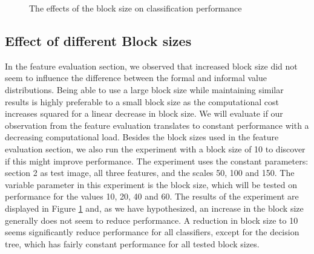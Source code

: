 \datatwo

\begin{figure}[]
	\caption{The effects of the block size on classification performance}
	\label{fig:res_bar_2}
\end{figure}

\subsection{Effect of different Block sizes}
In the feature evaluation section, we observed that increased block size did not seem to influence the difference between the formal and informal value distributions. Being able to use a large block size while maintaining similar results is highly preferable to a small block size as the computational cost increases squared for a linear decrease in block size. We will evaluate if our observation from the feature evaluation translates to constant performance with a decreasing computational load. Besides the block sizes used in the feature evaluation section, we also run the experiment with a block size of 10 to discover if this might improve performance. The experiment uses the constant parameters: section 2 as test image, all three features, and the scales 50, 100 and 150. The variable parameter in this experiment is the block size, which will be tested on performance for the values 10, 20, 40 and 60. The results of the experiment are displayed in Figure \ref{fig:res_bar_2} and, as we have hypothesized, an increase in the block size generally does not seem to reduce performance. A reduction in block size to 10 seems significantly reduce performance for all classifiers, except for the decision tree, which has fairly constant performance for all tested block sizes.




